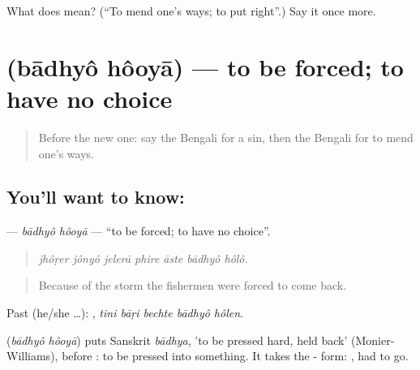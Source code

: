 \begin{tcolorbox}[breakable,colback=teal!4,colframe=teal!35!black,title={Before you move on}]
What does  mean? (\textquotedblleft{}To mend one's ways; to put right\textquotedblright{}.) Say it once more.
\end{tcolorbox}
\section[\texorpdfstring{\bn{বাধ্য} \bn{হওয়া} (bādhyô hôoyā)}{বাধ্য হওয়া (bādhyô hôoyā)}]{  (bādhyô hôoyā) — to be forced; to have no choice}

\label{lesson:BN-C325-badhyo-hooya}



\begin{quote}
Before the new one: say the Bengali for a sin, then the Bengali for to mend one's ways.
\end{quote}

\subsection*{You'll want to know:  }
\textbf{ } — \emph{bādhyô hôoyā} — \textquotedblleft{}to be forced; to have no choice\textquotedblright{}.

\begin{quote}
      
\end{quote}

\begin{quote}
\emph{jhôṛer jônyô jelerā phire āste bādhyô hôlô.}
\end{quote}

\begin{quote}
Because of the storm the fishermen were forced to come back.
\end{quote}

Past (he/she …):     , \emph{tini bāṛi bechte bādhyô hôlen}.

\begin{cousinweb}
\textbf{ } (\emph{bādhyô hôoyā}) puts Sanskrit \emph{bādhya}, 'to be pressed hard, held back' (Monier-Williams), before \textbf{}: to be pressed into something. It takes the - form:   , had to go.
\end{cousinweb}

